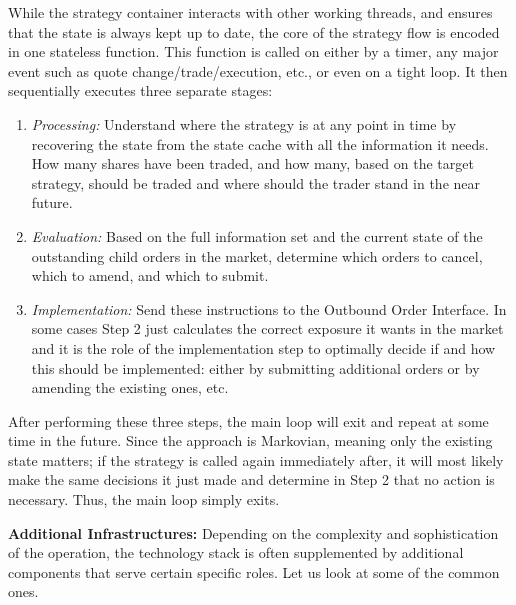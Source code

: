 While the strategy container interacts with other working threads, and ensures that the state is always kept up to date, the core of the strategy flow is encoded in one stateless function. This function is called on either by a timer, any major event such as quote change/trade/execution, etc., or even on a tight loop. It  then sequentially executes three separate stages:
        \begin{enumerate}
        \item\emph{Processing:} Understand where the strategy is at any point in time by recovering the state from the state cache with all the information it needs. How many shares have been traded, and how many, based on the target strategy, should be traded and where should the trader stand in the near future. 
        \item\emph{Evaluation:} Based on the full information set and the current state of the outstanding child orders in the market, determine which orders to cancel, which to amend, and which to submit.
        \item\emph{Implementation:} Send these instructions to the Outbound Order Interface. In some cases Step 2 just calculates the correct exposure it wants in the market and it is the role of the implementation step to optimally decide if and how this should be implemented: either by submitting additional orders or by amending the existing ones, etc.
        \end{enumerate}
After performing these three steps, the main loop will exit and repeat at some time in the future. Since the approach is Markovian, meaning only the existing state matters; if the strategy is called again immediately after, it will most likely make the same decisions it just made and determine in Step 2 that no action is necessary. Thus, the main loop simply exits. \twomedskip


\noindent\textbf{Additional Infrastructures:} Depending on the complexity and sophistication of the operation, the technology stack is often supplemented by additional components that serve certain specific roles. Let us look at some of the common ones. \twomedskip


